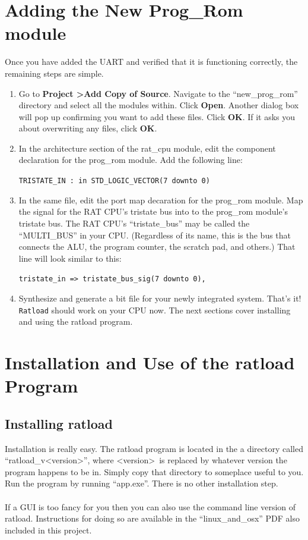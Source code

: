 \documentclass[notitlepage]{article}
\begin{document}
\section{Adding the New Prog\_Rom module}
Once you have added the UART and verified that it is functioning correctly, the remaining steps are simple.
\begin{enumerate}
\item Go to \textbf{Project \textgreater Add Copy of Source}. Navigate to the ``new\_prog\_rom'' directory and select all the modules within. Click \textbf{Open}. Another dialog box will pop up confirming you want to add these files. Click \textbf{OK}. If it asks you about overwriting any files, click \textbf{OK}.

\item In the architecture section of the rat\_cpu module, edit the component declaration for the prog\_rom module. Add the following line:\\
  \centerline{\texttt{TRISTATE\_IN : in STD\_LOGIC\_VECTOR(7 downto 0)}}

\item In the same file, edit the port map decaration for the prog\_rom module. Map the signal for the RAT CPU's tristate bus into to the prog\_rom module's tristate bus. The RAT CPU's ``tristate\_bus'' may be called the ``MULTI\_BUS'' in your CPU. (Regardless of its name, this is the bus that connects the ALU, the program counter, the scratch pad, and others.) That line will look similar to this:\\
  \centerline{\texttt{tristate\_in =\textgreater ~tristate\_bus\_sig(7 downto 0),}}

\item Synthesize and generate a bit file for your newly integrated system. That's it! \texttt{Ratload} should work on your CPU now. The next sections cover installing and using the ratload program.
\end{enumerate}

\section{Installation and Use of the ratload Program}
\label{sec:installation}
\subsection{Installing ratload}
Installation is really easy. The ratload program is located in the a directory called ``ratload\_v{\textless}version\textgreater'', where {\textless}version\textgreater~is replaced by whatever version the program happens to be in. Simply copy that directory to someplace useful to you. Run the program by running ``app.exe''. There is no other installation step.\\\\
If a GUI is too fancy for you then you can also use the command line version of ratload. Instructions for doing so are available in the ``linux\_and\_osx'' PDF also included in this project.
\end{document}

